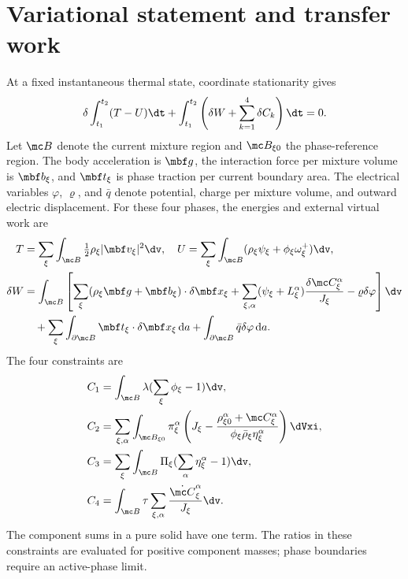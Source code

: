 \documentclass[11pt]{article}
\begin{document}
\section{Variational statement and transfer work}
At a fixed instantaneous thermal state, coordinate stationarity gives
\begin{equation}
 \delta\int_{t_1}^{t_2}(T-U)\dt+
 \int_{t_1}^{t_2}\left(\delta W+\sum_{k=1}^4\delta C_k\right)\dt=0.
 \label{eq:variational_principle}
\end{equation}
Let \(\mc B\) denote the current mixture region and \(\mc B_{\xi0}\) the phase-reference region. The body acceleration is \(\mbf g\), the interaction force per mixture volume is \(\mbf b_\xi\), and \(\mbf t_\xi\) is phase traction per current boundary area. The electrical variables \(\varphi\), \(\varrho\), and \(\bar q\) denote potential, charge per mixture volume, and outward electric displacement. For these four phases, the energies and external virtual work are
\begin{align}
 T&=\sum_\xi\int_{\mc B}\tfrac12\rho_\xi|\mbf v_\xi|^2\dv,
 \quad U=\sum_\xi\int_{\mc B}(\rho_\xi\psi_\xi+\phi_\xi\omega_\xi^+)\dv,\label{eq:energies}\\
 \delta W&=\int_{\mc B}\left[\sum_\xi(\rho_\xi\mbf g+\mbf b_\xi)\cdot\delta\mbf x_\xi
 +\sum_{\xi,\alpha}(\psi_\xi+L_\xi^\alpha)\frac{\delta\mc C_\xi^\alpha}{J_\xi}
 -\varrho\delta\varphi\right]\dv\notag\\
 &\quad+\sum_\xi\int_{\partial\mc B}\mbf t_\xi\cdot\delta\mbf x_\xi\,{\rm d}a
 +\int_{\partial\mc B}\bar q\delta\varphi\,{\rm d}a.\label{eq:virtual_work}
\end{align}
The four constraints are
\begin{align}
 C_1&=\int_{\mc B}\lambda(\sum_\xi\phi_\xi-1)\dv,\notag\\
 C_2&=\sum_{\xi,\alpha}\int_{\mc B_{\xi0}}\pi_\xi^\alpha
 \left(J_\xi-\frac{\rho_{\xi0}^\alpha+\mc C_\xi^\alpha}{\phi_\xi\bar\rho_\xi\eta_\xi^\alpha}\right)\dVxi,\notag\\
 C_3&=\sum_\xi\int_{\mc B}\Pi_\xi(\sum_\alpha\eta_\xi^\alpha-1)\dv,\notag\\
 C_4&=\int_{\mc B}\tau\sum_{\xi,\alpha}\frac{\dot{\mc C}_\xi^\alpha}{J_\xi}\dv.
 \label{eq:constraints}
\end{align}
The component sums in a pure solid have one term. The ratios in these constraints are evaluated for positive component masses; phase boundaries require an active-phase limit.
\end{document}
